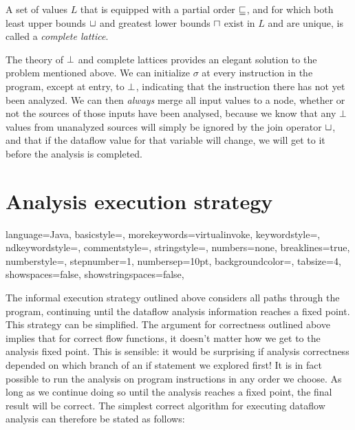 \documentclass[11pt]{article}
\begin{document}
A set of values $L$ that is equipped with a partial order $\sqsubseteq$, and for which
both least upper bounds $\sqcup$ and greatest lower bounds $\sqcap$ exist in $L$
and are unique, is called a \emph{complete lattice}.

The theory of $\bot$ and complete lattices provides an elegant solution to
the problem mentioned above.  We can initialize $\sigma$ at every instruction in
the program, except at entry, to $\bot$, indicating that the instruction
there has not yet been analyzed.  We can then \emph{always} merge all input
values to a node, whether or not the sources of those inputs have been analysed,
because we know that any $\bot$ values from unanalyzed sources will simply be
ignored by the join operator $\sqcup$, and that if the dataflow value for that
variable will change, we will get to it before the analysis is completed.

\section{Analysis execution strategy}



 {
language=Java,
basicstyle=\ttfamily,
  morekeywords={virtualinvoke},
  keywordstyle=\color{blue},
  ndkeywordstyle=\color{red},
  commentstyle=\color{dkred},
  stringstyle=\color{dkgreen},
  numbers=none,
  breaklines=true,
  numberstyle=\ttfamily\footnotesize\color{gray},
  stepnumber=1,
  numbersep=10pt,
  backgroundcolor=\color{white},
  tabsize=4,
  showspaces=false,
  showstringspaces=false,
}
\lstset{style=javastyle}

The informal execution strategy outlined above considers all
paths through the program, continuing until the dataflow analysis information
reaches a fixed point.  This strategy can be simplified.  The argument for
correctness outlined above implies that for correct flow functions, it doesn't
matter how we get to the analysis fixed point.  This is
sensible: it would be surprising if analysis 
correctness depended on which branch of an if statement we
explored first!  It is in fact possible to run the analysis on program
instructions in any order we choose.  As long as we continue doing so until the
analysis reaches a fixed point, the final result will be correct.  The simplest
correct algorithm for executing dataflow analysis can therefore be stated as
follows:
\end{document}
